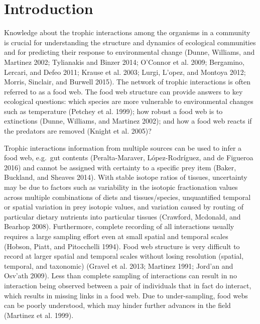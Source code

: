 \documentclass{article}
\begin{document}
\hypertarget{introduction}{%
\section{Introduction}\label{introduction}}

Knowledge about the trophic interactions among the organisms in a
community is crucial for understanding the structure and dynamics of
ecological communities and for predicting their response to
environmental change (Dunne, Williams, and Martinez 2002; Tylianakis and
Binzer 2014; O'Connor et al. 2009; Bergamino, Lercari, and Defeo 2011;
Krause et al. 2003; Lurgi, L'opez, and Montoya 2012; Morris, Sinclair,
and Burwell 2015). The network of trophic interactions is often referred
to as a food web. The food web structure can provide answers to key
ecological questions: which species are more vulnerable to environmental
changes such as temperature (Petchey et al. 1999); how robust a food web
is to extinctions (Dunne, Williams, and Martinez 2002); and how a food
web reacts if the predators are removed (Knight et al. 2005)?

Trophic interactions information from multiple sources can be used to
infer a food web, e.g.~gut contents (Peralta-Maraver, López-Rodríguez,
and de Figueroa 2016) and cannot be assigned with certainty to a
specific prey item (Baker, Buckland, and Sheaves 2014). With stable
isotope ratios of tissues, uncertainty may be due to factors such as
variability in the isotopic fractionation values across multiple
combinations of diets and tissues/species, unquantified temporal or
spatial variation in prey isotopic values, and variation caused by
routing of particular dietary nutrients into particular tissues
(Crawford, Mcdonald, and Bearhop 2008). Furthermore, complete recording
of all interactions usually requires a large sampling effort even at
small spatial and temporal scales (Hobson, Piatt, and Pitocchelli 1994).
Food web structure is very difficult to record at larger spatial and
temporal scales without losing resolution (spatial, temporal, and
taxonomic) (Gravel et al. 2013; Martinez 1991; Jord'an and Osv'ath
2009). Less than complete sampling of interactions can result in no
interaction being observed between a pair of individuals that in fact do
interact, which results in missing links in a food web. Due to
under-sampling, food webs can be poorly understood, which may hinder
further advances in the field (Martinez et al. 1999).
\end{document}
